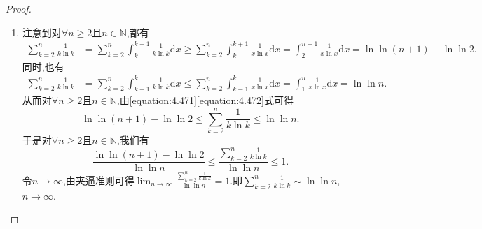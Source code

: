 \documentclass[../../main.tex]{subfiles}%
\begin{document}
\begin{proof}
\begin{enumerate}
\item 注意到对\(\forall n\geqslant 2\)且\(n\in\mathbb{N}\),都有
\begin{align}\label{equation:4.471}
\sum\limits_{k = 2}^n\frac{1}{k\ln k}&=\sum\limits_{k = 2}^n\int_{k}^{k + 1}\frac{1}{k\ln k}\mathrm{d}x
\geqslant\sum\limits_{k = 2}^n\int_{k}^{k + 1}\frac{1}{x\ln x}\mathrm{d}x
=\int_{2}^{n + 1}\frac{1}{x\ln x}\mathrm{d}x
=\ln\ln(n + 1) - \ln\ln 2.
\end{align}
同时,也有
\begin{align}\label{equation:4.472}
\sum\limits_{k = 2}^n\frac{1}{k\ln k}&=\sum\limits_{k = 2}^n\int_{k - 1}^{k}\frac{1}{k\ln k}\mathrm{d}x
\leqslant\sum\limits_{k = 2}^n\int_{k - 1}^{k}\frac{1}{x\ln x}\mathrm{d}x
=\int_{1}^{n}\frac{1}{x\ln x}\mathrm{d}x
=\ln\ln n.
\end{align}
从而对\(\forall n\geqslant 2\)且\(n\in\mathbb{N}\),由\eqref{equation:4.471}\eqref{equation:4.472}式可得
\[
\ln\ln(n + 1) - \ln\ln 2\leqslant\sum\limits_{k = 2}^n\frac{1}{k\ln k}\leqslant\ln\ln n.
\]
于是对\(\forall n\geqslant 2\)且\(n\in\mathbb{N}\),我们有
\[
\frac{\ln\ln(n + 1) - \ln\ln 2}{\ln\ln n}\leqslant\frac{\sum\limits_{k = 2}^n\frac{1}{k\ln k}}{\ln\ln n}\leqslant 1.
\]
令\(n\rightarrow\infty\),由夹逼准则可得\(\lim_{n\rightarrow\infty}\frac{\sum\limits_{k = 2}^n\frac{1}{k\ln k}}{\ln\ln n}=1\).即\(\sum\limits_{k = 2}^n\frac{1}{k\ln k}\sim\ln\ln n\),\(n\rightarrow\infty\).
\end{enumerate}
\end{proof}
\end{document}
